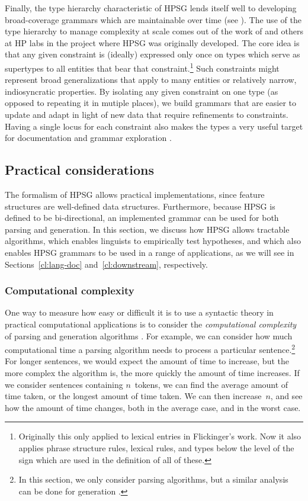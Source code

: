 \documentclass[output=paper,nonflat]{langsci/langscibook}
\begin{document}
Finally, the type hierarchy characteristic of HPSG lends itself well to developing broad-coverage grammars which are maintainable over time (see \citealt{Syg:Win:11}). The use of the type hierarchy to manage complexity at scale comes out of the work of \citet{Flickinger87} and others at HP labs in the project where HPSG was originally developed. The core idea is that any given constraint is (ideally) expressed only once on types which serve as supertypes to all entities that bear that constraint.\footnote{Originally this only applied to lexical entries in Flickinger's work. Now it also applies phrase structure rules, lexical rules, and types below the level of the sign which are used in the definition of all of these.} Such constraints might represent broad generalizations that apply to many entities or relatively narrow, indiosyncratic properties. By isolating any given constraint on one type (as opposed to repeating it in mutiple places), we build grammars that are easier to update and adapt in light of new data that require refinements to constraints. Having a single locus for each constraint also makes the types a very useful target for documentation \citep{Hashimoto-etal:07} and grammar exploration \citep{Letcher:18}. 


\subsection{Practical considerations}
\label{cl:prac}

The formalism of HPSG allows practical implementations,
since feature structures are well-defined data structures.
Furthermore, because HPSG is defined to be bi-directional,
an implemented grammar can be used for both parsing and generation.
In this section, we discuss how HPSG allows tractable algorithms,
which enables linguists to empirically test hypotheses,
and which also enables HPSG grammars to be used in a range of applications,
as we will see in Sections~\ref{cl:lang-doc} and~\ref{cl:downstream}, respectively.

\subsubsection{Computational complexity}
\label{cl:prac:comp}

One way to measure how easy or difficult it is to use a syntactic theory in practical computational applications
is to consider the \textit{computational complexity} of parsing and generation algorithms \citep{gazdar1985complexity}.
For example, we can consider how much computational time
a parsing algorithm needs to process a particular sentence.\footnote{%
	In this section, we only consider parsing algorithms,
	but a similar analysis can be done for generation
	\citep[\eg][]{carroll1999generate}.
}
For longer sentences, we would expect the amount of time to increase,
but the more complex the algorithm is,
the more quickly the amount of time increases.
If we consider sentences containing $n$~tokens,
we can find the average amount of time taken,
or the longest amount of time taken.
We can then increase~$n$, and see how the amount of time changes,
both in the average case, and in the worst case.
\end{document}
